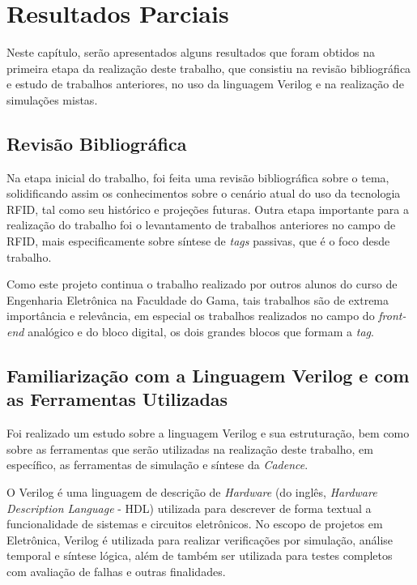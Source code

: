 
\chapter{Resultados Parciais}

Neste capítulo, serão apresentados alguns resultados que foram obtidos na primeira etapa da realização deste trabalho, que consistiu na revisão bibliográfica e estudo de trabalhos anteriores, no uso da linguagem Verilog e na realização de simulações mistas.

\section{Revisão Bibliográfica}

Na etapa inicial do trabalho, foi feita uma revisão bibliográfica sobre o tema, solidificando assim os conhecimentos sobre o cenário atual do uso da tecnologia RFID, tal como seu histórico e projeções futuras. Outra etapa importante para a realização do trabalho foi o levantamento de trabalhos anteriores no campo de RFID, mais especificamente sobre síntese de \textit{tags} passivas, que é o foco desde trabalho.

Como este projeto continua o trabalho realizado por outros alunos do curso de Engenharia Eletrônica na Faculdade do Gama, tais trabalhos são de extrema importância e relevância, em especial os trabalhos realizados no campo do \textit{front-end} analógico e do bloco digital, os dois grandes blocos que formam a \textit{tag}.

\section{Familiarização com a Linguagem Verilog e com as Ferramentas Utilizadas}

Foi realizado um estudo sobre a linguagem Verilog e sua estruturação, bem como sobre as ferramentas que serão utilizadas na realização deste trabalho, em específico, as ferramentas de simulação e síntese da \textit{Cadence}.


O Verilog é uma linguagem de descrição de \textit{Hardware} (do inglês, \textit{Hardware Description Language} - HDL) utilizada para descrever de forma textual a funcionalidade de sistemas e circuitos eletrônicos.
No escopo de projetos em Eletrônica, Verilog é utilizada para realizar verificações por simulação, análise temporal e síntese lógica, além de também ser utilizada para testes completos com avaliação de falhas e outras finalidades.

